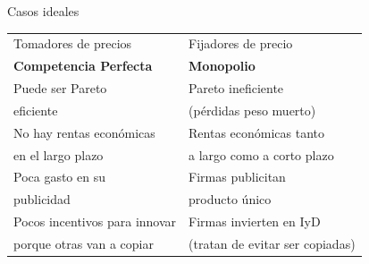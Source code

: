 \documentclass{beamer}
\begin{document}
\begin{frame}{Casos ideales}
    \small
    \begin{center}
    \renewcommand{\arraystretch}{1.3} %
        \setlength{\tabcolsep}{6pt} %
        \begin{tabular}{P|P}
        \hline
        Tomadores de precios & Fijadores de precio \\
        \textbf{Competencia Perfecta} & \textbf{Monopolio}
        \\
        \hline
        Puede ser Pareto  & Pareto ineficiente \\ 
        eficiente & (pérdidas peso muerto) \\
        \hline
        No hay rentas económicas & Rentas económicas tanto \\
        en el largo plazo & a largo como a corto plazo \\
        \hline
        Poca gasto en su & Firmas publicitan \\ publicidad & producto único 
        \\
        \hline
        Pocos incentivos para innovar & Firmas invierten en IyD \\ 
        porque otras van a copiar & (tratan de evitar ser copiadas)
    \end{tabular}
    \end{center}
\end{frame}
\end{document}
